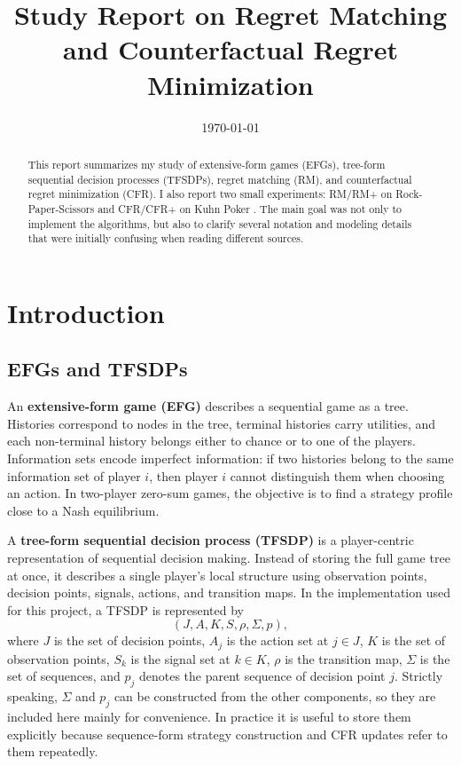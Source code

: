 \documentclass[11pt]{article}
\title{Study Report on Regret Matching and Counterfactual Regret Minimization}
\author{}
\date{\today}
\begin{document}
\maketitle

\begin{abstract}
This report summarizes my study of extensive-form games (EFGs), tree-form sequential decision processes (TFSDPs), regret matching (RM), and counterfactual regret minimization (CFR). I also report two small experiments: RM/RM+ on Rock-Paper-Scissors and CFR/CFR+ on Kuhn Poker \cite{wikipediaKuhnPoker}. The main goal was not only to implement the algorithms, but also to clarify several notation and modeling details that were initially confusing when reading different sources.
\end{abstract}

\section{Introduction}

\subsection{EFGs and TFSDPs}

An \textbf{extensive-form game (EFG)} describes a sequential game as a tree. Histories correspond to nodes in the tree, terminal histories carry utilities, and each non-terminal history belongs either to chance or to one of the players. Information sets encode imperfect information: if two histories belong to the same information set of player $i$, then player $i$ cannot distinguish them when choosing an action. In two-player zero-sum games, the objective is to find a strategy profile close to a Nash equilibrium.

A \textbf{tree-form sequential decision process (TFSDP)} is a player-centric representation of sequential decision making. Instead of storing the full game tree at once, it describes a single player's local structure using observation points, decision points, signals, actions, and transition maps. In the implementation used for this project, a TFSDP is represented by
\[
(J, A, K, S, \rho, \Sigma, p),
\]
where $J$ is the set of decision points, $A_j$ is the action set at $j \in J$, $K$ is the set of observation points, $S_k$ is the signal set at $k \in K$, $\rho$ is the transition map, $\Sigma$ is the set of sequences, and $p_j$ denotes the parent sequence of decision point $j$. Strictly speaking, $\Sigma$ and $p_j$ can be constructed from the other components, so they are included here mainly for convenience. In practice it is useful to store them explicitly because sequence-form strategy construction and CFR updates refer to them repeatedly.
\end{document}
